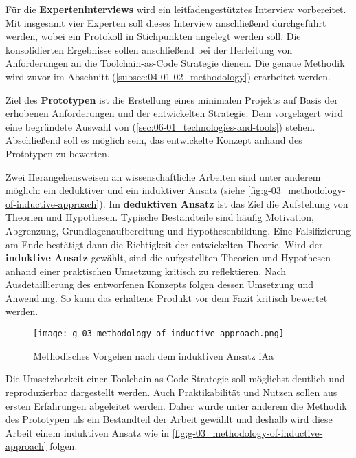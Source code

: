 Für die \textbf{Experteninterviews} wird ein leitfadengestütztes Interview vorbereitet. Mit insgesamt vier Experten soll dieses Interview anschließend durchgeführt werden, wobei ein Protokoll in Stichpunkten angelegt werden soll. Die konsolidierten Ergebnisse sollen anschließend bei der Herleitung von Anforderungen an die Toolchain-as-Code Strategie dienen. Die genaue Methodik wird zuvor im Abschnitt  (\autoref{subsec:04-01-02_methodology}) erarbeitet werden.

Ziel des \textbf{Prototypen} ist die Erstellung eines minimalen Projekts auf Basis der erhobenen Anforderungen und der entwickelten Strategie. Dem vorgelagert wird eine begründete Auswahl von  (\autoref{sec:06-01_technologies-and-tools}) stehen. Abschließend soll es möglich sein, das entwickelte Konzept anhand des Prototypen zu bewerten.

Zwei Herangehensweisen an wissenschaftliche Arbeiten sind unter anderem möglich: ein deduktiver und ein induktiver Ansatz (siehe \autoref{fig:g-03_methodology-of-inductive-approach}). Im \textbf{deduktiven Ansatz} ist das Ziel die Aufstellung von Theorien und Hypothesen. Typische Bestandteile sind häufig Motivation, Abgrenzung, Grundlagenaufbereitung und Hypothesenbildung. Eine Falsifizierung am Ende bestätigt dann die Richtigkeit der entwickelten Theorie. Wird der \textbf{induktive Ansatz} gewählt, sind die aufgestellten Theorien und Hypothesen anhand einer praktischen Umsetzung kritisch zu reflektieren. Nach Ausdetaillierung des entworfenen Konzepts folgen dessen Umsetzung und Anwendung. So kann das erhaltene Produkt vor dem Fazit kritisch bewertet werden. \cite{400:Beitrag-Produktrepraesentation-fuer-Bedarfs-und-Kapazitaetsmanagement-digitalisierter-Fahrzeuge}

\begin{figure}[h]
    \centering
    \texttt{[image: g-03\_methodology-of-inductive-approach.png]}
    \caption{Methodisches Vorgehen nach dem induktiven Ansatz \acrshort{iAa} \citeauthor{400:Beitrag-Produktrepraesentation-fuer-Bedarfs-und-Kapazitaetsmanagement-digitalisierter-Fahrzeuge}}
    \label{fig:g-03_methodology-of-inductive-approach}
\end{figure}

Die Umsetzbarkeit einer Toolchain-as-Code Strategie soll möglichst deutlich und reproduzierbar dargestellt werden. Auch Praktikabilität und Nutzen sollen aus ersten Erfahrungen abgeleitet werden. Daher wurde unter anderem die Methodik des Prototypen als ein Bestandteil der Arbeit gewählt und deshalb wird diese Arbeit einem induktiven Ansatz wie in \autoref{fig:g-03_methodology-of-inductive-approach} folgen.

